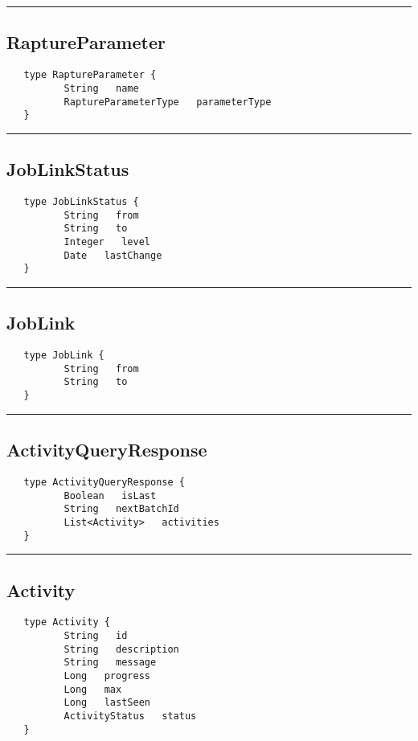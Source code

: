 \rule{15cm}{2pt}
\subsection{RaptureParameter}
\label{type:RaptureParameter}

\begin{verbatim}
   type RaptureParameter {
          String   name
          RaptureParameterType   parameterType
   }
\end{verbatim}

\rule{15cm}{2pt}
\subsection{JobLinkStatus}
\label{type:JobLinkStatus}

\begin{verbatim}
   type JobLinkStatus {
          String   from
          String   to
          Integer   level
          Date   lastChange
   }
\end{verbatim}

\rule{15cm}{2pt}
\subsection{JobLink}
\label{type:JobLink}

\begin{verbatim}
   type JobLink {
          String   from
          String   to
   }
\end{verbatim}

\rule{15cm}{2pt}
\subsection{ActivityQueryResponse}
\label{type:ActivityQueryResponse}

\begin{verbatim}
   type ActivityQueryResponse {
          Boolean   isLast
          String   nextBatchId
          List<Activity>   activities
   }
\end{verbatim}

\rule{15cm}{2pt}
\subsection{Activity}
\label{type:Activity}

\begin{verbatim}
   type Activity {
          String   id
          String   description
          String   message
          Long   progress
          Long   max
          Long   lastSeen
          ActivityStatus   status
   }
\end{verbatim}

